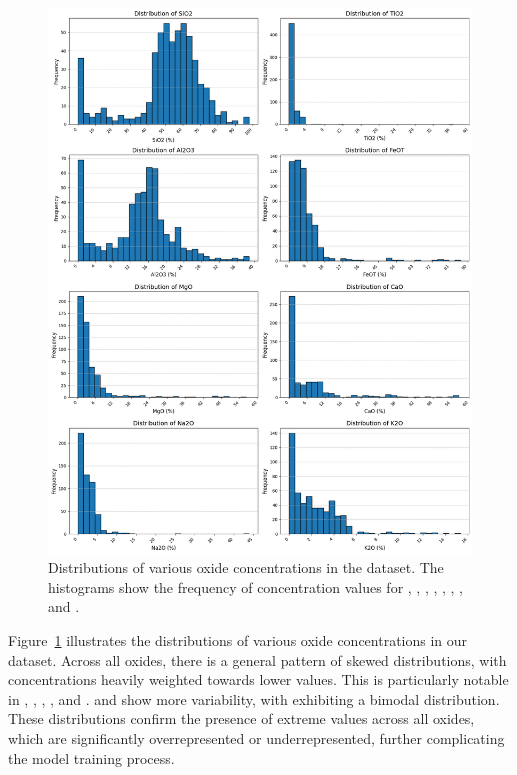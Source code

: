 \begin{figure}
    \centering
    \includegraphics[width=\textwidth]{images/oxide_distributions.png}
    \caption{Distributions of various oxide concentrations in the dataset. The histograms show the frequency of concentration values for , , , , , , , and .}
    \label{fig:oxide_distributions}
\end{figure}

Figure~\ref{fig:oxide_distributions} illustrates the distributions of various oxide concentrations in our dataset.
Across all oxides, there is a general pattern of skewed distributions, with concentrations heavily weighted towards lower values.
This is particularly notable in , , , , and .
 and  show more variability, with  exhibiting a bimodal distribution.
These distributions confirm the presence of extreme values across all oxides, which are significantly overrepresented or underrepresented, further complicating the model training process.

